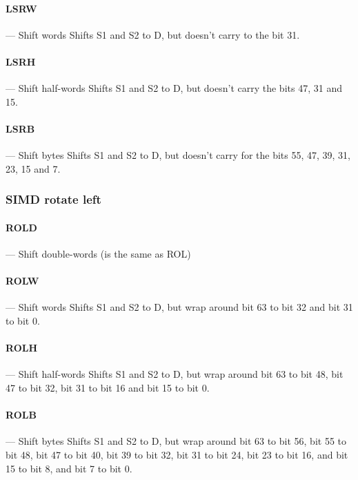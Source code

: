 \documentclass[11pt]{article}
\begin{document}
\paragraph{LSRW} --- Shift words\newline
Shifts S1 and S2 to D, but doesn't carry to the bit 31.

\paragraph{LSRH} --- Shift half-words\newline
Shifts S1 and S2 to D, but doesn't carry the bits 47, 31 and 15.

\paragraph{LSRB} --- Shift bytes\newline
Shifts S1 and S2 to D, but doesn't carry for the bits 55, 47, 39, 31, 23, 15
and 7.

\subsubsection{SIMD rotate left}

\paragraph{ROLD} --- Shift double-words (is the same as ROL)\newline

\paragraph{ROLW} --- Shift words\newline
Shifts S1 and S2 to D, but wrap around bit 63 to bit 32 and bit 31 to bit 0.

\paragraph{ROLH} --- Shift half-words\newline
Shifts S1 and S2 to D, but wrap around bit 63 to bit 48, bit 47 to bit 32, bit
31 to bit 16 and bit 15 to bit 0.

\paragraph{ROLB} --- Shift bytes\newline
Shifts S1 and S2 to D, but wrap around bit 63 to bit 56, bit 55 to bit 48, bit
47 to bit 40, bit 39 to bit 32, bit 31 to bit 24, bit 23 to bit 16, and bit 15
to bit 8, and bit 7 to bit 0.
\end{document}
